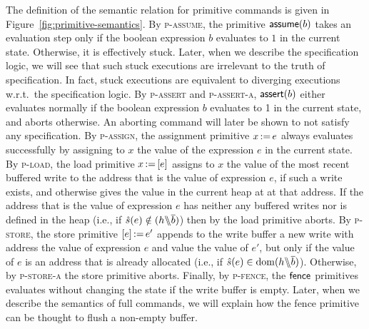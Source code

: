 \documentclass[11pt]{report}
\begin{document}
The definition of the semantic relation for primitive commands is given in Figure~\ref{fig:primitive-semantics}. By \textsc{p-assume}, the primitive $\operatorname{\mathsf{assume}}(b)$ takes an evaluation step only if the boolean expression $b$ evaluates to $1$ in the current state. Otherwise, it is effectively stuck. Later, when we describe the specification logic, we will see that such stuck executions are irrelevant to the truth of specification. In fact, stuck executions are equivalent to diverging executions w.r.t.\ the specification logic. By \textsc{p-assert} and \textsc{p-assert-a}, $\operatorname{\mathsf{assert}}(b)$ either evaluates normally if the boolean expression $b$ evaluates to 1 in the current state, and aborts otherwise. An aborting command will later be shown to not satisfy any specification. By \textsc{p-assign}, the assignment primitive $x \operatorname{:\!=} e$ always evaluates successfully by assigning to $x$ the value of the expression $e$ in the current state. By \textsc{p-load}, the load primitive $x \operatorname{:\!=} \left[ e \right]$ assigns to $x$ the value of the most recent buffered write to the address that is the value of expression $e$, if such a write exists, and otherwise gives the value in the current heap at at that address. If the address that is the value of expression $e$ has neither any buffered writes nor is defined in the heap (i.e., if $\hat{s}(e) \notin (h \backslash\!\!\backslash \overline{b})$) then by  the load primitive aborts. By \textsc{p-store}, the store primitive $\left[ e \right] \operatorname{:\!=} e'$ appends to the write buffer a new write with address the value of expression $e$ and value the value of $e'$, but only if the value of $e$ is an address that is already allocated (i.e., if $\hat{s}(e) \in \operatorname{\mathrm{dom}}(h \backslash\!\!\backslash \overline{b})$). Otherwise, by \textsc{p-store-a} the store primitive aborts. Finally, by \textsc{p-fence}, the $\operatorname{\mathsf{fence}}$ primitives evaluates without changing the state if the write buffer is empty. Later, when we describe the semantics of full commands, we will explain how the fence primitive can be thought to flush a non-empty buffer. 
\end{document}
